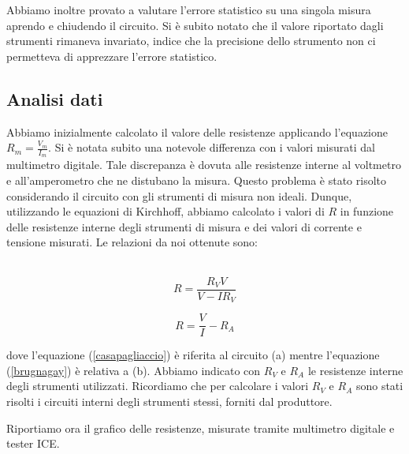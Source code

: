  Abbiamo inoltre provato a valutare l'errore statistico su una singola misura aprendo e chiudendo il circuito. Si è subito notato che il valore riportato dagli strumenti rimaneva invariato, indice che la precisione dello strumento non ci permetteva di apprezzare l'errore statistico.

\subsection{Analisi dati}

Abbiamo inizialmente calcolato il valore delle resistenze applicando l'equazione $R_m=\frac{V_m}{I_m}$. Si è notata subito una notevole differenza con i valori misurati dal multimetro digitale. Tale discrepanza è dovuta alle resistenze interne al voltmetro e all'amperometro che ne distubano la misura. Questo problema è stato risolto considerando il circuito con gli strumenti di misura non ideali. Dunque, utilizzando le equazioni di Kirchhoff, abbiamo calcolato i valori di $R$ in funzione delle resistenze interne degli strumenti di misura e dei valori di corrente e tensione misurati. Le relazioni da noi ottenute sono:\\
\\
\noindent\begin{minipage}{.5\linewidth}
\begin{equation}
R=\frac{R_VV}{V-IR_V}
\label{casapagliaccio}
\end{equation}
\end{minipage}%
\begin{minipage}{.5\linewidth}
\begin{equation}
R=\frac{V}{I}-R_A
\label{brugnagay}
\end{equation}
\end{minipage}
\break
dove l'equazione (\ref{casapagliaccio}) è riferita al circuito (a) mentre l'equazione (\ref{brugnagay}) è relativa a (b). Abbiamo indicato con $R_V$ e $R_A$ le resistenze interne degli strumenti utilizzati. 
Ricordiamo che per calcolare i valori $R_V$ e $R_A$ sono stati risolti i circuiti interni degli strumenti stessi, forniti dal produttore. 

Riportiamo ora il grafico delle resistenze, misurate tramite multimetro digitale e tester ICE. 

